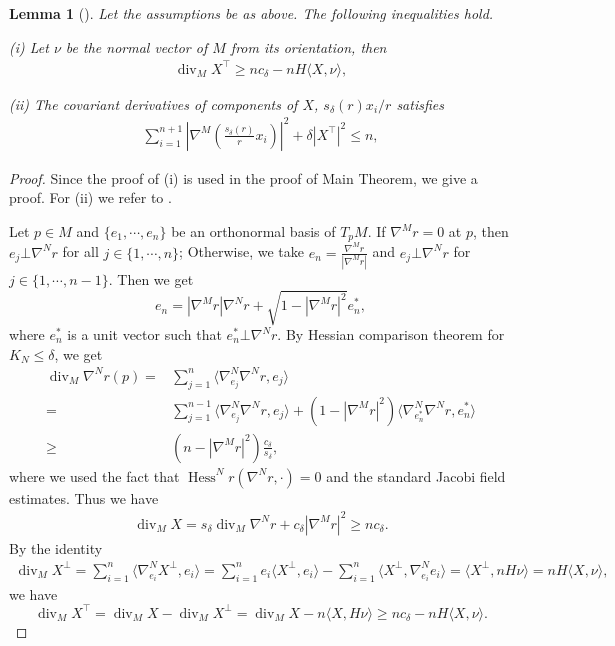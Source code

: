 \documentclass{amsart}
\numberwithin{equation}{section}
\newtheorem{lem}[theo]{Lemma}
\theoremstyle{remark}
\renewcommand{\(}{\left(}
\renewcommand{\)}{\right)}
\renewcommand{\~}{\tilde}
\renewcommand{\-}{\overline}
\renewcommand{\d}{\delta}
\newcommand{\divv}{\operatorname{div }}
\newcommand{\Hess}{\operatorname{Hess }}
\begin{document}
\begin{lem}[\cite{Heintze1988}]\label{lem-heintze}
	Let the assumptions be as above. The following inequalities hold.
	
	(i) Let $\nu$ be the normal vector of $M$ from its orientation, then
	\begin{align}\label{3.1}
	\divv_M X^\top\geq nc_\d-nH\langle X,\nu \rangle,
	\end{align}

	(ii) The covariant derivatives of components of $X$, $s_\d (r)x_i/r$ satisfies
	\begin{align}\label{3.2}
	\sum_{i=1}^{n+1}\left|\nabla^M \(\frac{s_\d(r)}{r}x_i\) \right|^2+ \d|X^\top|^2 \leq n,
	\end{align}
	
\end{lem}
\begin{proof}
	Since the proof of (i) is used in the proof of Main Theorem, we give a proof. For (ii) we refer to \cite{Heintze1988}.
	
	Let $p\in M$ and $\{e_1,\cdots,e_n\}$ be an orthonormal basis of $T_p M$. If $\nabla^M r=0$ at $p$, then $e_j\bot \nabla^N r$ for all $j\in\{1,\cdots,n\}$; Otherwise, we take $e_n=\frac{\nabla^M r}{|\nabla^M r|}$ and $e_j\bot \nabla^N r$ for $j\in \{1,\cdots,n-1\}$. Then we get
	$$
	e_n= |\nabla^M r|\nabla^N r+\sqrt{1-|\nabla^M r|^2}e_n^\ast,
	$$
	where $e_n^\ast$ is a unit vector such that $e_n^\ast \bot \nabla^N r$. By Hessian comparison theorem for $K_N\leq \d$, we get
	\begin{equation*}
	\begin{split}
	\divv_M \nabla^N r(p)=& \sum_{j=1}^{n}\langle \nabla^N_{e_j} \nabla^N r,e_j \rangle\\
	=&\sum_{j=1}^{n-1}\langle \nabla^N_{e_j} \nabla^N r,e_j \rangle+(1-|\nabla^M r|^2)\langle \nabla^N_{e_n^\ast} \nabla^N r,e_n^\ast \rangle \\
	\geq & (n-|\nabla^M r|^2)\frac{c_\d}{s_\d},
	\end{split}
	\end{equation*}
	where we used the fact that $\Hess^N r(\nabla^N r,\cdot)=0$ and the standard Jacobi field estimates. Thus we have
	\begin{align*}
	\divv_M X=s_\d \divv_M \nabla^N r+c_\d |\nabla^M r|^2\geq n c_\d.
	\end{align*}
	By the identity
	\begin{align*}
	\divv_M X^\bot=\sum_{i=1}^n \langle \nabla^N_{e_i} X^\bot,e_i \rangle=\sum_{i=1}^{n} e_i\langle X^\bot,e_i \rangle-\sum_{i=1}^n\langle X^\bot,\nabla^N_{e_i}e_i\rangle=\langle X^\bot,nH\nu\rangle=nH\langle X,\nu\rangle,
	\end{align*}
	we have
	$$
	\divv_M X^\top= \divv_M X-\divv_M X^\bot=\divv_M X-n\langle X,H\nu\rangle\geq n c_\d-nH\langle X,\nu\rangle.
	$$
\end{proof}
\end{document}
